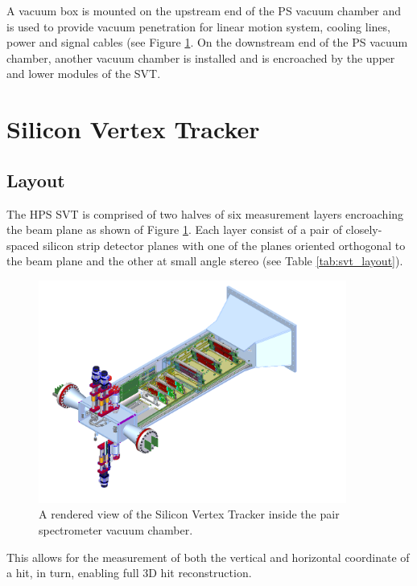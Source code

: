 A vacuum box is mounted on the upstream end of the PS vacuum 
chamber and is used to provide vacuum penetration for linear motion system, 
cooling lines, power and signal cables (see Figure \ref{fig:svt_layout_render}.
On the downstream end of the PS vacuum 
chamber, another vacuum chamber is installed and is encroached by the upper
and lower modules of the SVT.  


\section{Silicon Vertex Tracker}

\subsection{Layout}

The HPS SVT is comprised of two halves of six measurement layers encroaching the
beam plane as shown of Figure \ref{fig:svt_layout_render}. Each layer consist of a pair of
closely-spaced silicon strip detector planes with one of the planes oriented orthogonal to
the beam plane and the other at small angle stereo 
(see Table \ref{tab:svt_layout}).
\begin{figure}[h!t]
    \centering
    \includegraphics[width=0.9\textwidth]{images/svt_layout_render.png}
    \caption{A rendered view of the Silicon Vertex Tracker inside the pair
             spectrometer vacuum chamber.}
    \label{fig:svt_layout_render}
\end{figure}
This allows
for the measurement of both the vertical and horizontal coordinate of a hit, in turn, 
enabling full 3D hit reconstruction.  

